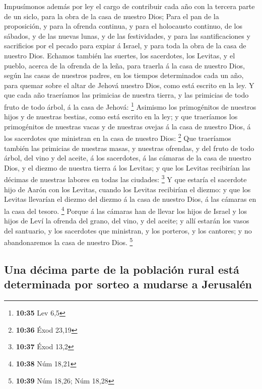  Impusímonos además por ley el cargo de contribuir cada año
con la tercera parte de un siclo, para la obra de la casa de nuestro
Dios;  Para el pan de la proposición, y para la ofrenda
continua, y para el holocausto continuo, de los sábados, y de las nuevas
lunas, y de las festividades, y para las santificaciones y sacrificios
por el pecado para expiar á Israel, y para toda la obra de la casa de
nuestro Dios.  Echamos también las suertes, los sacerdotes,
los Levitas, y el pueblo, acerca de la ofrenda de la leña, para traerla
á la casa de nuestro Dios, según las casas de nuestros padres, en los
tiempos determinados cada un año, para quemar sobre el altar de Jehová
nuestro Dios, como está escrito en la ley.  Y que cada año
traeríamos las primicias de nuestra tierra, y las primicias de todo
fruto de todo árbol, á la casa de Jehová: \footnote{\textbf{10:35} Lev
  6,5}  Asimismo los primogénitos de nuestros hijos y de
nuestras bestias, como está escrito en la ley; y que traeríamos los
primogénitos de nuestras vacas y de nuestras ovejas á la casa de nuestro
Dios, á los sacerdotes que ministran en la casa de nuestro Dios:
\footnote{\textbf{10:36} Éxod 23,19}  Que traeríamos
también las primicias de nuestras masas, y nuestras ofrendas, y del
fruto de todo árbol, del vino y del aceite, á los sacerdotes, á las
cámaras de la casa de nuestro Dios, y el diezmo de nuestra tierra á los
Levitas; y que los Levitas recibirían las décimas de nuestras labores en
todas las ciudades: \footnote{\textbf{10:37} Éxod 13,2}  Y
que estaría el sacerdote hijo de Aarón con los Levitas, cuando los
Levitas recibirían el diezmo: y que los Levitas llevarían el diezmo del
diezmo á la casa de nuestro Dios, á las cámaras en la casa del tesoro.
\footnote{\textbf{10:38} Núm 18,21}  Porque á las cámaras
han de llevar los hijos de Israel y los hijos de Leví la ofrenda del
grano, del vino, y del aceite; y allí estarán los vasos del santuario, y
los sacerdotes que ministran, y los porteros, y los cantores; y no
abandonaremos la casa de nuestro Dios. \footnote{\textbf{10:39} Núm
  18,26; Núm 18,28}

\hypertarget{una-duxe9cima-parte-de-la-poblaciuxf3n-rural-estuxe1-determinada-por-sorteo-a-mudarse-a-jerusaluxe9n}{%
\subsection{Una décima parte de la población rural está determinada por
sorteo a mudarse a
Jerusalén}\label{una-duxe9cima-parte-de-la-poblaciuxf3n-rural-estuxe1-determinada-por-sorteo-a-mudarse-a-jerusaluxe9n}}

